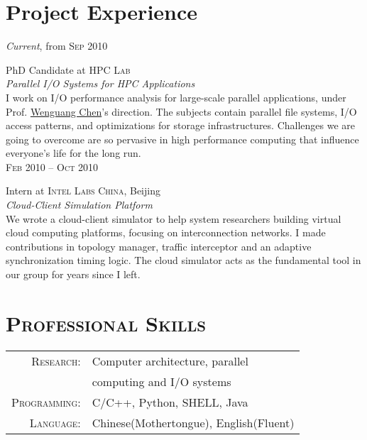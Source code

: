 \documentclass[10pt]{article}
\begin{document}
{\begin{minipage}[t]{0.5\textwidth}
        \section{Project Experience}
            \raggedleft
            \emph{Current}, from \textsc{Sep 2010}
            \par
            \raggedright
            \large PhD Candidate at \textsc{HPC Lab}\\
            \emph{Parallel I/O Systems for HPC Applications}\\[5pt]
            \normalsize{ I work on I/O performance analysis for large-scale
            parallel applications, under Prof.
            \href{http://hpc.cs.tsinghua.edu.cn/research/cluster/cwg.html}
            {Wenguang Chen}'s direction. The subjects contain parallel file
            systems, I/O access patterns, and optimizations for storage
            infrastructures.  Challenges we are going to overcome are so
            pervasive in high performance computing that influence everyone's
            life for the long run.}\\[12pt]
            \raggedleft
            \textsc{\normalsize Feb 2010 -- Oct 2010}
            \par
            \raggedright
            \large Intern at \textsc{Intel Labs China}, Beijing\\
            \emph{Cloud-Client Simulation Platform}\\[5pt]
            \normalsize{We wrote a cloud-client simulator to help system
            researchers building virtual cloud computing platforms, focusing
            on interconnection networks. I made contributions in topology
            manager, traffic interceptor and an adaptive synchronization
            timing logic. The cloud simulator acts as the fundamental tool in
            our group for years since I left.}\\[7pt]

        \section{\textsc{Professional Skills}}
            \begin{tabular}{rl}
                \textsc{Research}:
                & Computer architecture, parallel\\
                & computing and I/O systems
                \vspace{0.15cm}\\
                \textsc{Programming}:
                & C/C++, Python, SHELL, Java
                \vspace{0.15cm}\\
                \textsc{Language}:
                & Chinese(Mothertongue), English(Fluent)
            \end{tabular}\\[5pt]

\end{minipage}}
\end{document}

